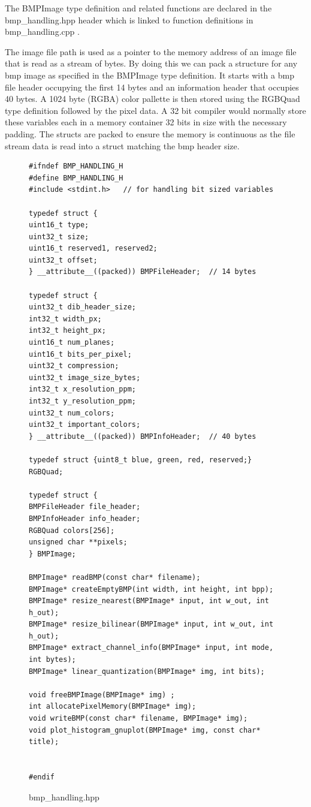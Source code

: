 \documentclass[11pt]{article}
\begin{document}
The BMPImage type definition and related functions are declared in the bmp\_handling.hpp header which is linked to function definitions in bmp\_handling.cpp .

The image file path is used as a pointer to the memory address of an image file that is read as a stream of bytes. By doing this we can pack a structure for any bmp image as specified in the BMPImage type definition. It starts with a bmp file header  occupying the first 14 bytes and an information header that occupies 40 bytes. A 1024 byte (RGBA) color pallette is then stored using the RGBQuad type definition followed by the pixel data.
A 32 bit compiler would normally store these variables each in a memory container 32 bits in size with the necessary padding. The structs are packed to ensure the memory is continuous as the file stream data is read into a struct matching the bmp header size.





\begin{figure}[H]
	\centering
	
\begin{verbatim}
#ifndef BMP_HANDLING_H
#define BMP_HANDLING_H
#include <stdint.h>   // for handling bit sized variables

typedef struct {
uint16_t type;
uint32_t size;
uint16_t reserved1, reserved2;
uint32_t offset;
} __attribute__((packed)) BMPFileHeader;  // 14 bytes

typedef struct {
uint32_t dib_header_size;
int32_t width_px;
int32_t height_px;
uint16_t num_planes;
uint16_t bits_per_pixel;
uint32_t compression;
uint32_t image_size_bytes;
int32_t x_resolution_ppm;
int32_t y_resolution_ppm;
uint32_t num_colors;
uint32_t important_colors;
} __attribute__((packed)) BMPInfoHeader;  // 40 bytes

typedef struct {uint8_t blue, green, red, reserved;} RGBQuad;

typedef struct {
BMPFileHeader file_header;
BMPInfoHeader info_header;
RGBQuad colors[256];
unsigned char **pixels; 
} BMPImage;

BMPImage* readBMP(const char* filename);
BMPImage* createEmptyBMP(int width, int height, int bpp);
BMPImage* resize_nearest(BMPImage* input, int w_out, int h_out);
BMPImage* resize_bilinear(BMPImage* input, int w_out, int h_out);
BMPImage* extract_channel_info(BMPImage* input, int mode, int bytes); 
BMPImage* linear_quantization(BMPImage* img, int bits);

void freeBMPImage(BMPImage* img) ;
int allocatePixelMemory(BMPImage* img);
void writeBMP(const char* filename, BMPImage* img); 
void plot_histogram_gnuplot(BMPImage* img, const char* title);


#endif
\end{verbatim}

\caption{bmp\_handling.hpp}
\label{figure:bmpHandling}
\end{figure}
\end{document}
